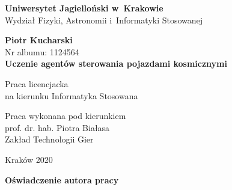 \documentclass[12pt, oneside]{article}
\begin{document}
  
\thispagestyle{empty}
\begin{titlepage}
    \begin{center}

           \Large
	\textbf{Uniwersytet Jagielloński w~Krakowie}\vspace{0.2cm}\\ Wydział Fizyki, Astronomii i~Informatyki Stosowanej
               \vspace*{1cm}
               
         \vspace{3cm}
         \Large
          \textbf{Piotr Kucharski}\\\vspace{0.5cm}
         \normalsize Nr albumu: 1124564\\
             \vspace{2cm}
        \Huge
        \textbf{Uczenie agentów sterowania pojazdami kosmicznymi}
      
        \vspace{1.5cm}
        \normalsize
        Praca licencjacka\\
        na kierunku Informatyka Stosowana\\ \vspace{0.15cm}
        
        \vfill
        \vspace{2cm}
       \begin{minipage}{1\textwidth}
\begin{flushright}
Praca wykonana pod kierunkiem\\
prof. dr. hab. Piotra Białasa\\
Zakład Technologii Gier
\end{flushright}
\end{minipage}
        
        \vspace{2cm}
        \begin{center}
      Kraków 2020
        \end{center}
    \end{center}
\end{titlepage}

\newpage 
 \thispagestyle{empty}
\vspace{2.5cm}
\begin{flushleft}
\large \textbf{Oświadczenie autora pracy}\vspace{0.6cm}\\
\end{flushleft}
\end{document}
